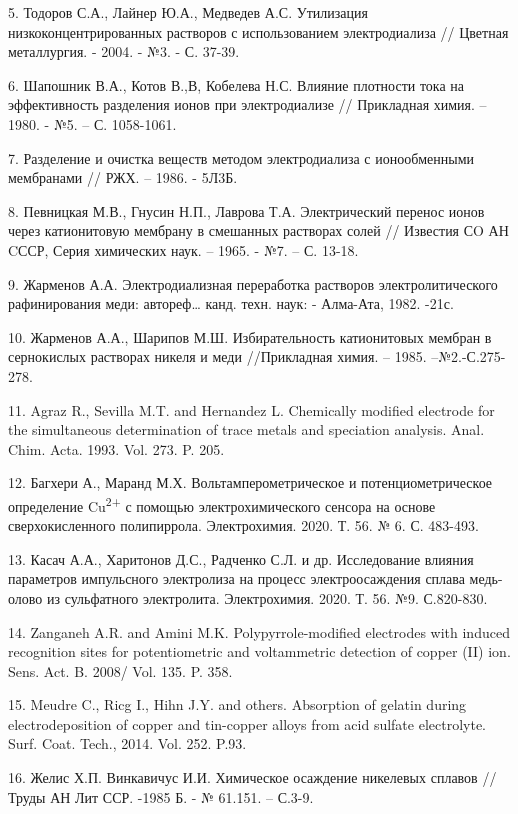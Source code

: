 5. Тодоров С.А., Лайнер Ю.А., Медведев А.С. Утилизация
низкоконцентрированных растворов с использованием электродиализа //
Цветная металлургия. - 2004. - №3. - С. 37-39.

6. Шапошник В.А., Котов В.,В, Кобелева Н.С. Влияние плотности тока на
эффективность разделения ионов при электродиализе // Прикладная химия.
-- 1980. - №5. -- С. 1058-1061.

7. Разделение и очистка веществ методом электродиализа с ионообменными
мембранами // РЖХ. -- 1986. - 5Л3Б.

8. Певницкая М.В., Гнусин Н.П., Лаврова Т.А. Электрический перенос ионов
через катионитовую мембрану в смешанных растворах солей // Известия СO
АН CССР, Серия химических наук. -- 1965. - №7. -- С. 13-18.

9. Жарменов А.А. Электродиализная переработка растворов
электролитического рафинирования меди: автореф\ldots{} канд. техн. наук:
- Алма-Ата, 1982. -21с.

10. Жарменов А.А., Шарипов М.Ш. Избирательность катионитовых мембран в
сернокислых растворах никеля и меди //Прикладная химия. -- 1985.
--№2.-С.275-278.

11. Agraz R., Sevilla M.T. and Hernandez L. Chemically modified
electrode for the simultaneous determination of trace metals and
speciation analysis. Anal. Chim. Acta. 1993. Vol. 273. P. 205.

12. Багхери А., Маранд М.Х. Вольтамперометрическое и потенциометрическое
определение Cu\textsuperscript{2+} с помощью электрохимического сенсора
на основе сверхокисленного полипиррола. Электрохимия. 2020. Т. 56. № 6.
С. 483-493.

13. Касач А.А., Харитонов Д.С., Радченко С.Л. и др. Исследование влияния
параметров импульсного электролиза на процесс электроосаждения сплава
медь-олово из сульфатного электролита. Электрохимия. 2020. Т. 56. №9.
С.820-830.

14. Zanganeh A.R. and Amini M.K. Polypyrrole-modified electrodes with
induced recognition sites for potentiometric and voltammetric detection
of copper (II) ion. Sens. Act. B. 2008/ Vol. 135. P. 358.

15. Meudre C., Ricg I., Hihn J.Y. and others. Absorption of gelatin
during electrodeposition of copper and tin-copper alloys from acid
sulfate electrolyte. Surf. Coat. Tech., 2014. Vol. 252. P.93.

16. Желис Х.П. Винкавичус И.И. Химическое осаждение никелевых сплавов //
Труды АН Лит ССР. -1985 Б. - № 61.151. -- С.3-9.

